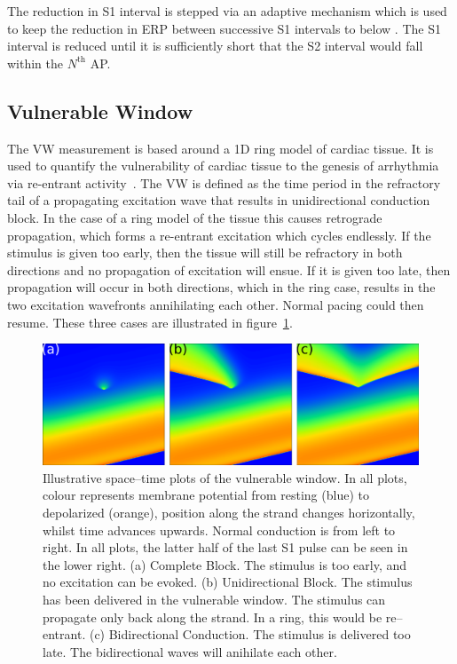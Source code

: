 The reduction in S1 interval is stepped via an adaptive mechanism which is
used to keep the reduction in ERP between successive S1 intervals to below
.  The S1 interval is reduced until it is sufficiently short that the
S2 interval would fall within the $N^{\text{th}}$ AP.

\subsection{Vulnerable Window}

The VW measurement is based around a 1D ring model of cardiac tissue.
It is used to quantify the vulnerability of cardiac tissue to the genesis of
arrhythmia via re-entrant activity~\cite{Quan1990,Zhang2003,Gonzalez2003}.
The VW is defined as the time period in the refractory tail of a propagating
excitation wave that results in unidirectional conduction block.
In the case of a ring model of the tissue this causes retrograde propagation,
which forms a re-entrant excitation which cycles endlessly.
If the stimulus is given too early, then the tissue will still be refractory in
both directions and no propagation of excitation will ensue.
If it is given too late, then propagation will occur in both directions, which
in the ring case, results in the two excitation wavefronts annihilating each
other.
Normal pacing could then resume.
These three cases are illustrated in figure~\ref{fig:toolkit:illus:vw}.


\begin{figure}
\centering
\includegraphics{figures/toolkit/illustrations/vw}
\caption[Illustration of VW cases]{
\label{fig:toolkit:illus:vw}
Illustrative space--time plots of the vulnerable window.
In all plots, colour represents membrane potential from resting (blue) to
depolarized (orange), position along the strand changes horizontally, whilst
time advances upwards.
Normal conduction is from left to right.
In all plots, the latter half of the last S1 pulse can be seen in the lower
right.
(a) Complete Block.  The stimulus is too early, and no excitation can be evoked.
(b) Unidirectional Block.
The stimulus has been delivered in the vulnerable window.
The stimulus can propagate only back along the strand.
In a ring, this would be re--entrant.
(c) Bidirectional Conduction.
The stimulus is delivered too late.
The bidirectional waves will anihilate each other.
}
\end{figure}


